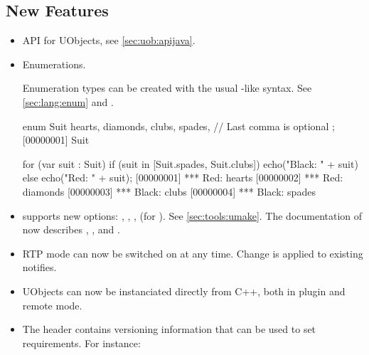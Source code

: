\subsection{New Features}
\begin{itemize}
\item \Java API for UObjects, see \autoref{sec:uob:apijava}.

\item Enumerations.

  Enumeration types can be created with the usual \C-like syntax.
  See \autoref{sec:lang:enum} and .
\begin{urbiscript}
enum Suit
{
  hearts,
  diamonds,
  clubs,
  spades, // Last comma is optional
};
[00000001] Suit

for (var suit : Suit)
  if (suit in [Suit.spades, Suit.clubs])
    echo("Black: " + suit)
  else
    echo("Red: " + suit);
[00000001] *** Red: hearts
[00000002] *** Red: diamonds
[00000003] *** Black: clubs
[00000004] *** Black: spades
\end{urbiscript}

\item {} supports new options: , ,
  ,  (for ).  See
  \autoref{sec:tools:umake}. The documentation of  now
  describes , , and
  .

\item RTP mode can now be switched on at any time. Change is applied to existing
  notifies.

\item UObjects can now be instanciated directly from C++, both in plugin and
  remote mode.

\item The \Cxx header  contains versioning
  information that can be used to set requirements.   For instance:



\end{itemize}

